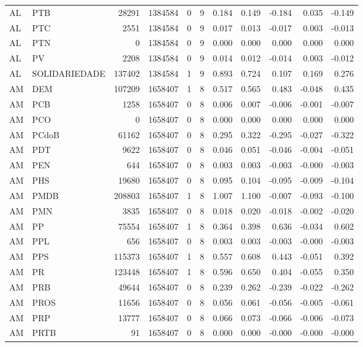 \begin{landscape}
\begin{longtable}{llrrrrrrrrr}
AL & PTB & 28291 & 1384584 & 0 & 9 & 0.184 & 0.149 & -0.184 & 0.035 & -0.149 \\
AL & PTC & 2551 & 1384584 & 0 & 9 & 0.017 & 0.013 & -0.017 & 0.003 & -0.013 \\
AL & PTN & 0 & 1384584 & 0 & 9 & 0.000 & 0.000 & 0.000 & 0.000 & 0.000 \\
AL & PV & 2208 & 1384584 & 0 & 9 & 0.014 & 0.012 & -0.014 & 0.003 & -0.012 \\
AL & SOLIDARIEDADE & 137402 & 1384584 & 1 & 9 & 0.893 & 0.724 & 0.107 & 0.169 & 0.276 \\
AM & DEM & 107209 & 1658407 & 1 & 8 & 0.517 & 0.565 & 0.483 & -0.048 & 0.435 \\
AM & PCB & 1258 & 1658407 & 0 & 8 & 0.006 & 0.007 & -0.006 & -0.001 & -0.007 \\
AM & PCO & 0 & 1658407 & 0 & 8 & 0.000 & 0.000 & 0.000 & 0.000 & 0.000 \\
AM & PCdoB & 61162 & 1658407 & 0 & 8 & 0.295 & 0.322 & -0.295 & -0.027 & -0.322 \\
AM & PDT & 9622 & 1658407 & 0 & 8 & 0.046 & 0.051 & -0.046 & -0.004 & -0.051 \\
AM & PEN & 644 & 1658407 & 0 & 8 & 0.003 & 0.003 & -0.003 & -0.000 & -0.003 \\
AM & PHS & 19680 & 1658407 & 0 & 8 & 0.095 & 0.104 & -0.095 & -0.009 & -0.104 \\
AM & PMDB & 208803 & 1658407 & 1 & 8 & 1.007 & 1.100 & -0.007 & -0.093 & -0.100 \\
AM & PMN & 3835 & 1658407 & 0 & 8 & 0.018 & 0.020 & -0.018 & -0.002 & -0.020 \\
AM & PP & 75554 & 1658407 & 1 & 8 & 0.364 & 0.398 & 0.636 & -0.034 & 0.602 \\
AM & PPL & 656 & 1658407 & 0 & 8 & 0.003 & 0.003 & -0.003 & -0.000 & -0.003 \\
AM & PPS & 115373 & 1658407 & 1 & 8 & 0.557 & 0.608 & 0.443 & -0.051 & 0.392 \\
AM & PR & 123448 & 1658407 & 1 & 8 & 0.596 & 0.650 & 0.404 & -0.055 & 0.350 \\
AM & PRB & 49644 & 1658407 & 0 & 8 & 0.239 & 0.262 & -0.239 & -0.022 & -0.262 \\
AM & PROS & 11656 & 1658407 & 0 & 8 & 0.056 & 0.061 & -0.056 & -0.005 & -0.061 \\
AM & PRP & 13777 & 1658407 & 0 & 8 & 0.066 & 0.073 & -0.066 & -0.006 & -0.073 \\
AM & PRTB & 91 & 1658407 & 0 & 8 & 0.000 & 0.000 & -0.000 & -0.000 & -0.000 \\

\end{longtable}
\end{landscape}
